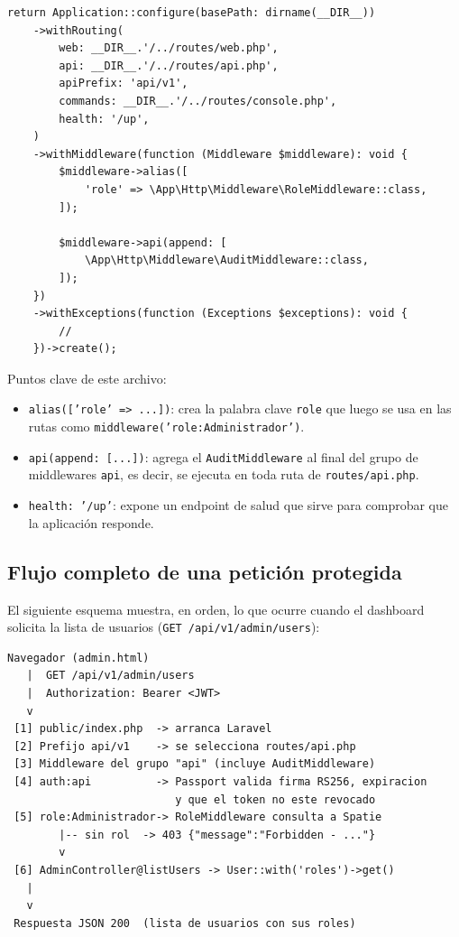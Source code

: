 \begin{lstlisting}[caption={Configuración de rutas y middlewares en bootstrap/app.php}]
return Application::configure(basePath: dirname(__DIR__))
    ->withRouting(
        web: __DIR__.'/../routes/web.php',
        api: __DIR__.'/../routes/api.php',
        apiPrefix: 'api/v1',
        commands: __DIR__.'/../routes/console.php',
        health: '/up',
    )
    ->withMiddleware(function (Middleware $middleware): void {
        $middleware->alias([
            'role' => \App\Http\Middleware\RoleMiddleware::class,
        ]);

        $middleware->api(append: [
            \App\Http\Middleware\AuditMiddleware::class,
        ]);
    })
    ->withExceptions(function (Exceptions $exceptions): void {
        //
    })->create();
\end{lstlisting}

Puntos clave de este archivo:
\begin{itemize}
    \item \texttt{alias(['role' => ...])}: crea la palabra clave \texttt{role} que luego se usa en las rutas como \texttt{middleware('role:Administrador')}.
    \item \texttt{api(append: [...])}: agrega el \texttt{AuditMiddleware} al final del grupo de middlewares \texttt{api}, es decir, se ejecuta en toda ruta de \texttt{routes/api.php}.
    \item \texttt{health: '/up'}: expone un endpoint de salud que sirve para comprobar que la aplicación responde.
\end{itemize}

\subsection{Flujo completo de una petición protegida}
El siguiente esquema muestra, en orden, lo que ocurre cuando el dashboard solicita la lista de usuarios (\texttt{GET /api/v1/admin/users}):

\begin{lstlisting}[language={}, caption={Ciclo de vida de una petición protegida}]
 Navegador (admin.html)
   |  GET /api/v1/admin/users
   |  Authorization: Bearer <JWT>
   v
 [1] public/index.php  -> arranca Laravel
 [2] Prefijo api/v1    -> se selecciona routes/api.php
 [3] Middleware del grupo "api" (incluye AuditMiddleware)
 [4] auth:api          -> Passport valida firma RS256, expiracion
                          y que el token no este revocado
 [5] role:Administrador-> RoleMiddleware consulta a Spatie
        |-- sin rol  -> 403 {"message":"Forbidden - ..."}
        v
 [6] AdminController@listUsers -> User::with('roles')->get()
   |
   v
 Respuesta JSON 200  (lista de usuarios con sus roles)
\end{lstlisting}

